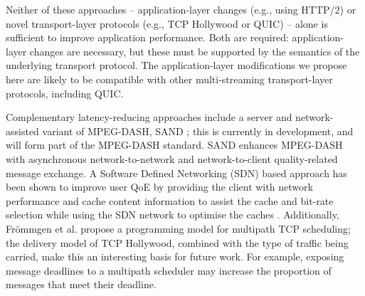 Neither of these approaches -- application-layer changes (e.g., using HTTP/2) or 
novel transport-layer protocols (e.g., TCP Hollywood or QUIC) -- alone is sufficient to
improve application performance. Both are required: application-layer changes are
necessary, but these must be supported by the semantics of the underlying transport
protocol. The application-layer modifications we propose here are likely to be compatible
with other multi-streaming transport-layer protocols, including QUIC.

Complementary latency-reducing approaches include a server and network-assisted variant
of MPEG-DASH, SAND \cite{thomas2015enhancing}; this is currently in development, and will form part
of the MPEG-DASH standard. SAND enhances MPEG-DASH with asynchronous network-to-network
and network-to-client quality-related message exchange. A Software Defined Networking
(SDN) based approach has been shown to improve user QoE by providing the client with
network performance and cache content information to assist the cache and bit-rate
selection while using the SDN network to optimise the caches \cite{bhat2017network}.
Additionally, Fr\"ommgen et al. \cite{frommgen2017programming} propose a programming model
for multipath TCP scheduling; the delivery model of TCP Hollywood, combined with the type
of traffic being carried, make this an interesting basis for future work. For example,
exposing message deadlines to a multipath scheduler may increase the proportion of
messages that meet their deadline.